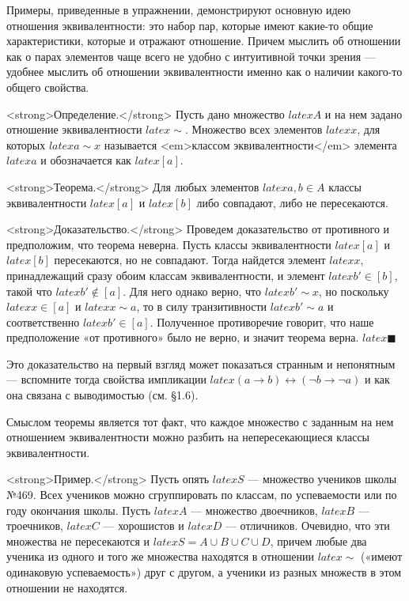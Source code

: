 Примеры, приведенные в упражнении, демонстрируют основную идею отношения эквивалентности: это набор пар, которые имеют какие-то общие характеристики, которые и отражают отношение. Причем мыслить об отношении как о парах элементов чаще всего не удобно с интуитивной точки зрения — удобнее мыслить об отношении эквивалентности именно как о наличии какого-то общего свойства.

<strong>Определение.</strong> Пусть дано множество $latex A$ и на нем задано отношение эквивалентности $latex \sim$. Множество всех элементов $latex x$, для которых $latex a\sim x$ называется <em>классом эквивалентности</em> элемента $latex a$ и обозначается как $latex [a]$.

<strong>Теорема.</strong> Для любых элементов $latex a, b \in A$ классы эквивалентности $latex [a]$ и $latex [b]$ либо совпадают, либо не пересекаются.

<strong>Доказательство.</strong> Проведем доказательство от противного и предположим, что теорема неверна. Пусть классы эквивалентности $latex [a]$ и $latex [b]$ пересекаются, но не совпадают. Тогда найдется элемент $latex x$, принадлежащий сразу обоим классам эквивалентности, и элемент $latex b' \in [b]$, такой что $latex b' \not\in [a]$. Для него однако верно, что $latex b' \sim x$, но поскольку $latex x \in [a]$ и $latex x\sim a$, то в силу транзитивности $latex b' \sim a$ и соответственно $latex b' \in [a]$. Полученное противоречие говорит, что наше предположение «от противного» было не верно, и значит теорема верна. $latex \blacksquare$

Это доказательство на первый взгляд может показаться странным и непонятным — вспомните тогда свойства импликации $latex (a\rightarrow b) \leftrightarrow (\neg b \rightarrow \neg a)$ и как она связана с выводимостью (см. §1.6).

Смыслом теоремы является тот факт, что каждое множество с заданным на нем отношением эквивалентности можно разбить на непересекающиеся классы эквивалентности.

<strong>Пример.</strong> Пусть опять $latex S$ — множество учеников школы №469. Всех учеников можно сгруппировать по классам, по успеваемости или по году окончания школы. Пусть $latex A$ — множество двоечников, $latex B$ — троечников, $latex C$ — хорошистов и $latex D$ — отличников. Очевидно, что эти множества не пересекаются и $latex S = A\cup B\cup C\cup D$, причем любые два ученика из одного и того же множества находятся в отношении $latex \sim$ («имеют одинаковую успеваемость») друг с другом, а ученики из разных множеств в этом отношении не находятся.


